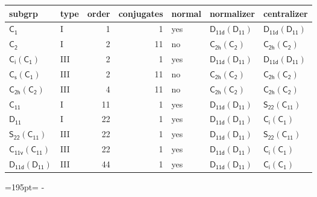 \documentclass[10pt,a4paper]{article}
\newcommand{\needspace}[1]{\par\penalty-100\begingroup\dimen0=#1\relax\dimen2=\pagegoal
  \advance\dimen2-\pagetotal\ifdim\dimen0>\dimen2\relax\ifdim\dimen2>0pt\vfil\break\fi\fi
  \endgroup}
\numberwithin{equation}{section}
\newcommand{\grp}[1]{\mathsf{#1}}
\begin{document}
{\small\begin{longtable}{@{}llrrlll@{}}\toprule
subgrp & type & order & conjugates & normal & normalizer & centralizer\\\midrule\endhead
\bottomrule\endfoot\endlastfoot
\href{../../../rotation/data/pdf/C1.pdf}{$\grp{C_{1}}$} & I & 1 & 1 & yes & \href{D11d-D11.pdf}{$\grp{D_{11d}}(\grp{D_{11}})$} & \href{D11d-D11.pdf}{$\grp{D_{11d}}(\grp{D_{11}})$}\\*
\href{../../../rotation/data/pdf/C2.pdf}{$\grp{C_{2}}$} & I & 2 & 11 & no & \href{C2h-C2.pdf}{$\grp{C_{2h}}(\grp{C_{2}})$} & \href{C2h-C2.pdf}{$\grp{C_{2h}}(\grp{C_{2}})$}\\*
\href{S2-C1.pdf}{$\grp{C_{i}}(\grp{C_{1}})$} & III & 2 & 1 & yes & \href{D11d-D11.pdf}{$\grp{D_{11d}}(\grp{D_{11}})$} & \href{D11d-D11.pdf}{$\grp{D_{11d}}(\grp{D_{11}})$}\\*
\href{C1v-C1.pdf}{$\grp{C_{s}}(\grp{C_{1}})$} & III & 2 & 11 & no & \href{C2h-C2.pdf}{$\grp{C_{2h}}(\grp{C_{2}})$} & \href{C2h-C2.pdf}{$\grp{C_{2h}}(\grp{C_{2}})$}\\*
\href{C2h-C2.pdf}{$\grp{C_{2h}}(\grp{C_{2}})$} & III & 4 & 11 & no & \href{C2h-C2.pdf}{$\grp{C_{2h}}(\grp{C_{2}})$} & \href{C2h-C2.pdf}{$\grp{C_{2h}}(\grp{C_{2}})$}\\*
\href{../../../rotation/data/pdf/C11.pdf}{$\grp{C_{11}}$} & I & 11 & 1 & yes & \href{D11d-D11.pdf}{$\grp{D_{11d}}(\grp{D_{11}})$} & \href{S22-C11.pdf}{$\grp{S_{22}}(\grp{C_{11}})$}\\*
\href{../../../rotation/data/pdf/D11.pdf}{$\grp{D_{11}}$} & I & 22 & 1 & yes & \href{D11d-D11.pdf}{$\grp{D_{11d}}(\grp{D_{11}})$} & \href{S2-C1.pdf}{$\grp{C_{i}}(\grp{C_{1}})$}\\*
\href{S22-C11.pdf}{$\grp{S_{22}}(\grp{C_{11}})$} & III & 22 & 1 & yes & \href{D11d-D11.pdf}{$\grp{D_{11d}}(\grp{D_{11}})$} & \href{S22-C11.pdf}{$\grp{S_{22}}(\grp{C_{11}})$}\\*
\href{C11v-C11.pdf}{$\grp{C_{11v}}(\grp{C_{11}})$} & III & 22 & 1 & yes & \href{D11d-D11.pdf}{$\grp{D_{11d}}(\grp{D_{11}})$} & \href{S2-C1.pdf}{$\grp{C_{i}}(\grp{C_{1}})$}\\*
\href{D11d-D11.pdf}{$\grp{D_{11d}}(\grp{D_{11}})$} & III & 44 & 1 & yes & \href{D11d-D11.pdf}{$\grp{D_{11d}}(\grp{D_{11}})$} & \href{S2-C1.pdf}{$\grp{C_{i}}(\grp{C_{1}})$}\\
\bottomrule\end{longtable}}
\needspace{195pt}
\end{document}
